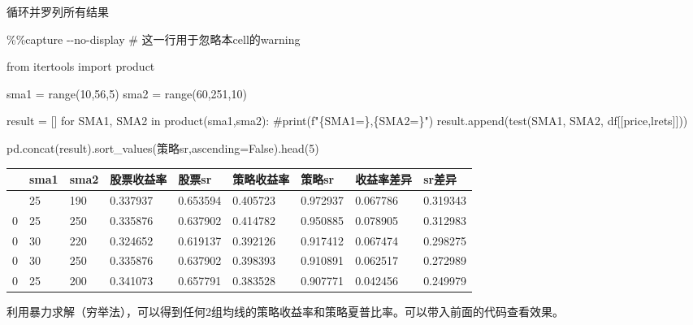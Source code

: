 \documentclass[
  letterpaper,
  DIV=11,
  numbers=noendperiod]{scrreprt}
\newenvironment{Shaded}{\begin{snugshade}}{\end{snugshade}}
\newcommand{\BuiltInTok}[1]{\textcolor[rgb]{0.00,0.23,0.31}{#1}}
\newcommand{\CommentTok}[1]{\textcolor[rgb]{0.37,0.37,0.37}{#1}}
\newcommand{\ControlFlowTok}[1]{\textcolor[rgb]{0.00,0.23,0.31}{#1}}
\newcommand{\DecValTok}[1]{\textcolor[rgb]{0.68,0.00,0.00}{#1}}
\newcommand{\ImportTok}[1]{\textcolor[rgb]{0.00,0.46,0.62}{#1}}
\newcommand{\KeywordTok}[1]{\textcolor[rgb]{0.00,0.23,0.31}{#1}}
\newcommand{\NormalTok}[1]{\textcolor[rgb]{0.00,0.23,0.31}{#1}}
\newcommand{\OperatorTok}[1]{\textcolor[rgb]{0.37,0.37,0.37}{#1}}
\newcommand{\StringTok}[1]{\textcolor[rgb]{0.13,0.47,0.30}{#1}}
\newcommand{\VariableTok}[1]{\textcolor[rgb]{0.07,0.07,0.07}{#1}}
\begin{document}
循环并罗列所有结果

\begin{Shaded}
\begin{Highlighting}[]
\OperatorTok{\%\%}\NormalTok{capture }\OperatorTok{{-}{-}}\NormalTok{no}\OperatorTok{{-}}\NormalTok{display }
\CommentTok{\# 这一行用于忽略本cell的warning}

\ImportTok{from}\NormalTok{ itertools }\ImportTok{import}\NormalTok{ product}

\NormalTok{sma1 }\OperatorTok{=} \BuiltInTok{range}\NormalTok{(}\DecValTok{10}\NormalTok{,}\DecValTok{56}\NormalTok{,}\DecValTok{5}\NormalTok{) }
\NormalTok{sma2 }\OperatorTok{=} \BuiltInTok{range}\NormalTok{(}\DecValTok{60}\NormalTok{,}\DecValTok{251}\NormalTok{,}\DecValTok{10}\NormalTok{)}

\NormalTok{result }\OperatorTok{=}\NormalTok{ []}
\ControlFlowTok{for}\NormalTok{ SMA1, SMA2 }\KeywordTok{in}\NormalTok{ product(sma1,sma2):}
    \CommentTok{\#print(f"\{SMA1=\},\{SMA2=\}")}
\NormalTok{    result.append(test(SMA1, SMA2, df[[}\StringTok{\textquotesingle{}price\textquotesingle{}}\NormalTok{,}\StringTok{\textquotesingle{}lrets\textquotesingle{}}\NormalTok{]]))}

\NormalTok{pd.concat(result).sort\_values(}\StringTok{\textquotesingle{}策略sr\textquotesingle{}}\NormalTok{,ascending}\OperatorTok{=}\VariableTok{False}\NormalTok{).head(}\DecValTok{5}\NormalTok{)}
\end{Highlighting}
\end{Shaded}

\begin{longtable}[]{@{}lllllllll@{}}
\toprule\noalign{}
& sma1 & sma2 & 股票收益率 & 股票sr & 策略收益率 & 策略sr & 收益率差异 &
sr差异 \\
\midrule\noalign{}
\endhead
\bottomrule\noalign{}
\endlastfoot
0 & 25 & 190 & 0.337937 & 0.653594 & 0.405723 & 0.972937 & 0.067786 &
0.319343 \\
0 & 25 & 250 & 0.335876 & 0.637902 & 0.414782 & 0.950885 & 0.078905 &
0.312983 \\
0 & 30 & 220 & 0.324652 & 0.619137 & 0.392126 & 0.917412 & 0.067474 &
0.298275 \\
0 & 30 & 250 & 0.335876 & 0.637902 & 0.398393 & 0.910891 & 0.062517 &
0.272989 \\
0 & 25 & 200 & 0.341073 & 0.657791 & 0.383528 & 0.907771 & 0.042456 &
0.249979 \\
\end{longtable}

利用暴力求解（穷举法），可以得到任何2组均线的策略收益率和策略夏普比率。可以带入前面的代码查看效果。
\end{document}
